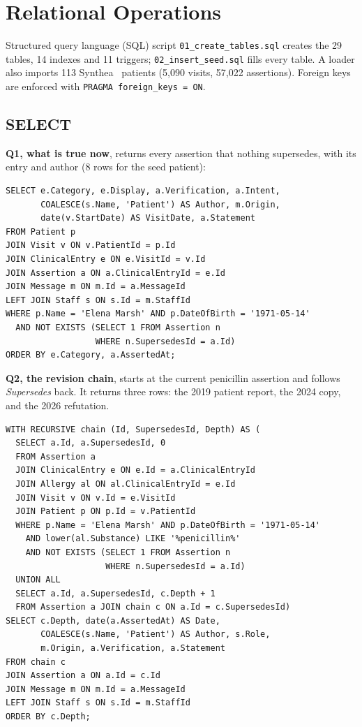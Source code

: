 \documentclass[sigconf]{acmart}
\begin{document}
\section{Relational Operations}\label{sec:operations}
Structured query language (SQL) script \texttt{01\_create\_\allowbreak tables.sql} creates the 29 tables, 14 indexes and 11 triggers; \texttt{02\_insert\_seed.sql} fills every table. A loader also imports 113 Synthea~\cite{synthea} patients (5,090 visits, 57,022 assertions). Foreign keys are enforced with \texttt{PRAGMA foreign\_keys = ON}.

\subsection{SELECT}
\textbf{Q1, what is true now}, returns every assertion that nothing supersedes, with its entry and author (8 rows for the seed patient):
\par\noindent\begin{minipage}{\columnwidth}\begin{lstlisting}
SELECT e.Category, e.Display, a.Verification, a.Intent,
       COALESCE(s.Name, 'Patient') AS Author, m.Origin,
       date(v.StartDate) AS VisitDate, a.Statement
FROM Patient p
JOIN Visit v ON v.PatientId = p.Id
JOIN ClinicalEntry e ON e.VisitId = v.Id
JOIN Assertion a ON a.ClinicalEntryId = e.Id
JOIN Message m ON m.Id = a.MessageId
LEFT JOIN Staff s ON s.Id = m.StaffId
WHERE p.Name = 'Elena Marsh' AND p.DateOfBirth = '1971-05-14'
  AND NOT EXISTS (SELECT 1 FROM Assertion n
                  WHERE n.SupersedesId = a.Id)
ORDER BY e.Category, a.AssertedAt;
\end{lstlisting}\end{minipage}\par
\textbf{Q2, the revision chain}, starts at the current penicillin assertion and follows \emph{Supersedes} back. It returns three rows: the 2019 patient report, the 2024 copy, and the 2026 refutation.
\par\noindent\begin{minipage}{\columnwidth}\begin{lstlisting}
WITH RECURSIVE chain (Id, SupersedesId, Depth) AS (
  SELECT a.Id, a.SupersedesId, 0
  FROM Assertion a
  JOIN ClinicalEntry e ON e.Id = a.ClinicalEntryId
  JOIN Allergy al ON al.ClinicalEntryId = e.Id
  JOIN Visit v ON v.Id = e.VisitId
  JOIN Patient p ON p.Id = v.PatientId
  WHERE p.Name = 'Elena Marsh' AND p.DateOfBirth = '1971-05-14'
    AND lower(al.Substance) LIKE '%penicillin%'
    AND NOT EXISTS (SELECT 1 FROM Assertion n
                    WHERE n.SupersedesId = a.Id)
  UNION ALL
  SELECT a.Id, a.SupersedesId, c.Depth + 1
  FROM Assertion a JOIN chain c ON a.Id = c.SupersedesId)
SELECT c.Depth, date(a.AssertedAt) AS Date,
       COALESCE(s.Name, 'Patient') AS Author, s.Role,
       m.Origin, a.Verification, a.Statement
FROM chain c
JOIN Assertion a ON a.Id = c.Id
JOIN Message m ON m.Id = a.MessageId
LEFT JOIN Staff s ON s.Id = m.StaffId
ORDER BY c.Depth;
\end{lstlisting}\end{minipage}\par
\end{document}
